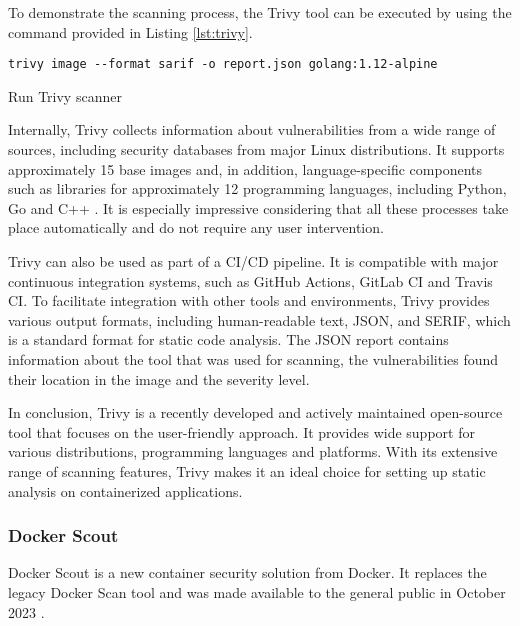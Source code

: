 To demonstrate the scanning process, the Trivy tool can be executed by using the command provided in Listing \ref{lst:trivy}.

\begin{listing}[htp]
    \centering
    \begin{minipage}{0.75\linewidth}
        \begin{verbatim}
trivy image --format sarif -o report.json golang:1.12-alpine
        \end{verbatim}
    \end{minipage}
    \caption{Run Trivy scanner}
    \label{lst:trivy}
\end{listing}

Internally, Trivy collects information about vulnerabilities from a wide range of sources, including security databases from major Linux distributions. It supports approximately 15 base images and, in addition, language-specific components such as libraries for approximately 12 programming languages, including Python, Go and C++ \cite{d:trivyvulnerability}. It is especially impressive considering that all these processes take place automatically and do not require any user intervention.

Trivy can also be used as part of a CI/CD pipeline. It is compatible with major continuous integration systems, such as GitHub Actions, GitLab CI and Travis CI. To facilitate integration with other tools and environments, Trivy provides various output formats, including human-readable text, JSON, and SERIF, which is a standard format for static code analysis. The JSON report contains information about the tool that was used for scanning, the vulnerabilities found their location in the image and the severity level.

In conclusion, Trivy is a recently developed and actively maintained open-source tool that focuses on the user-friendly approach. It provides wide support for various distributions, programming languages and platforms. With its extensive range of scanning features, Trivy makes it an ideal choice for setting up static analysis on containerized applications.


\subsubsection{Docker Scout}

Docker Scout is a new container security solution from Docker. It replaces the legacy Docker Scan tool and was made available to the general public in October 2023 \cite{s:scoutga}. 

